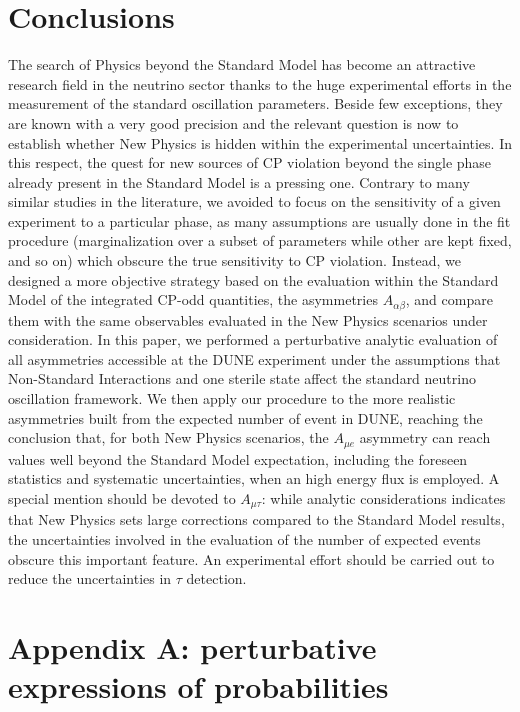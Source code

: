 \documentclass[12pt]{article}
\begin{document}
\section{Conclusions}
\label{concl}
The search of Physics beyond the Standard Model has become an attractive  research field in the neutrino  sector thanks to the huge experimental efforts in the measurement of the standard oscillation parameters. Beside few exceptions, they are known with a very good precision and the relevant question is now to establish whether New Physics is hidden within the experimental uncertainties. In this respect, the quest for new sources of CP violation beyond the single phase already present in the Standard Model is a pressing one. Contrary to many similar studies in the literature, we avoided to focus on the sensitivity of a given experiment to a particular phase, as many assumptions are usually done in the fit procedure (marginalization over a subset of parameters while other are kept fixed, and so on) which obscure the true sensitivity to CP violation.
Instead, we designed a more objective strategy based on the evaluation within the Standard Model of the integrated CP-odd quantities, the asymmetries $A_{\alpha\beta}$, and compare them with the same observables evaluated in the New Physics scenarios under consideration. In this paper, we performed a perturbative analytic evaluation of all asymmetries accessible at the DUNE experiment under the assumptions that Non-Standard  Interactions and one sterile state affect the standard neutrino  oscillation framework. We then apply our procedure to the more realistic asymmetries built from the expected number of event in DUNE, reaching the conclusion that, for both New Physics scenarios, the $A_{\mu e}$ asymmetry can reach values well beyond the Standard Model expectation, including the foreseen statistics and systematic uncertainties, when an high energy flux is employed. A special mention should be devoted to $A_{\mu \tau}$: while analytic considerations indicates that New Physics sets large corrections compared to the Standard Model results, the uncertainties involved in the evaluation of the number of expected events obscure this important feature. An experimental effort should be carried out to reduce the uncertainties in $\tau$ detection. 

\section*{Appendix A: perturbative expressions of probabilities}
\end{document}
